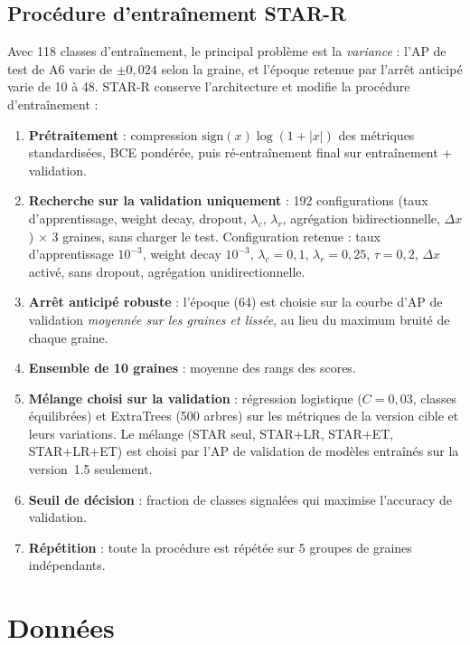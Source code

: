 \documentclass[11pt,a4paper,openany]{report}
\begin{document}
\section{Procédure d'entraînement STAR-R}
\label{sec:starr}
Avec 118 classes d'entraînement, le principal problème est la \emph{variance} : l'AP de test de A6 varie de
$\pm0{,}024$ selon la graine, et l'époque retenue par l'arrêt anticipé varie de 10 à 48. STAR-R conserve
l'architecture et modifie la procédure d'entraînement :
\begin{enumerate}
  \item \textbf{Prétraitement} : compression $\mathrm{sign}(x)\log(1+|x|)$ des métriques standardisées, BCE pondérée,
        puis ré-entraînement final sur entraînement + validation.
  \item \textbf{Recherche sur la validation uniquement} : 192 configurations (taux d'apprentissage, weight decay,
        dropout, $\lambda_c$, $\lambda_r$, agrégation bidirectionnelle, $\Delta x$) $\times$ 3 graines, sans charger le
        test. Configuration retenue : taux d'apprentissage $10^{-3}$, weight decay $10^{-3}$, $\lambda_c=0{,}1$,
        $\lambda_r=0{,}25$, $\tau=0{,}2$, $\Delta x$ activé, sans dropout, agrégation unidirectionnelle.
  \item \textbf{Arrêt anticipé robuste} : l'époque (64) est choisie sur la courbe d'AP de validation \emph{moyennée sur
        les graines et lissée}, au lieu du maximum bruité de chaque graine.
  \item \textbf{Ensemble de 10 graines} : moyenne des rangs des scores.
  \item \textbf{Mélange choisi sur la validation} : régression logistique ($C=0{,}03$, classes équilibrées) et
        ExtraTrees (500 arbres) sur les métriques de la version cible et leurs variations. Le mélange (STAR seul, STAR+LR,
        STAR+ET, STAR+LR+ET) est choisi par l'AP de validation de modèles entraînés sur la version~1.5 seulement.
  \item \textbf{Seuil de décision} : fraction de classes signalées qui maximise l'accuracy de validation.
  \item \textbf{Répétition} : toute la procédure est répétée sur 5 groupes de graines indépendants.
\end{enumerate}

\chapter{Données}
\end{document}
